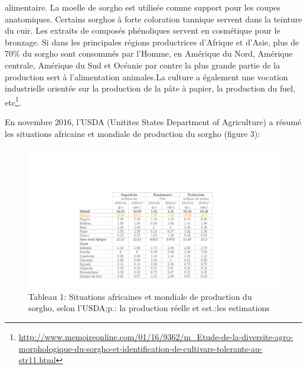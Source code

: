 \documentclass[a4paper,11pt]{article}
\begin{document}
alimentaire. La moelle de sorgho est utilisée comme support pour les
coupes anatomiques. Certains sorghos à forte coloration tannique
servent dans la teinture du cuir. Les extraits de composés phénoliques
servent en cosmétique pour le bronzage. Si dans les principales
régions productrices d’Afrique et d’Asie, plus de 70\% du sorgho sont
consommés par l’Homme, en Amérique du Nord, Amérique centrale,
Amérique du Sud et Océanie par contre la plus grande partie de la
production sert à l’alimentation animales\cite{BARRO_KONDOMBO_2010}.La
culture a également une vocation industrielle orientée sur la
production de la pâte à papier, la production du fuel,
etc\footnote{\url{http://www.memoireonline.com/01/16/9362/m_Etude-de-la-diversite-agro-morphologique-du-sorgho-et-identification-de-cultivars-tolerants-au-str11.html}}.

En novembre 2016, l’USDA (Unitites States Department of Agriculture) a résumé les situations africaine et mondiale de production du sorgho (figure 3):


\begin{figure}%
  \begin{center}
   \includegraphics[width=14cm]{images/WorldSorghumStatisticsUsda}
  \end{center}
  \caption{Tableau 1: Situations africaines et mondiale de production du sorgho, selon l’USDA;p.:
    la production réelle et est.:les estimations}
\end{figure}
\end{document}
